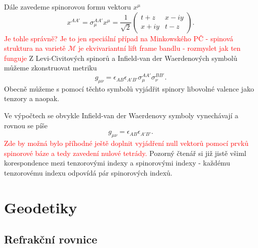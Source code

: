 Dále zavedeme spinorovou formu vektoru $x^\mu$
\begin{equation}
    x^{AA'} = \sigma_\mu^{AA'} x^\mu = \frac{1}{\sqrt{2}} \begin{pmatrix}
        t + z & x - iy \\
        x + iy & t - z
    \end{pmatrix}.
\end{equation}
\textcolor{red}{Je tohle správně? Je to jen speciální případ na Minkowského PČ - spinová
struktura na varietě $\mathcal{M}$ je ekvivariantní lift frame bandlu - rozmyslet jak ten
funguje}
Z Levi-Civitových spinorů a Infield-van der Waerdenových symbolů můžeme zkonstruovat metriku
\begin{equation}
    g_{\mu \nu} = \epsilon_{AB} \epsilon_{A'B'} \sigma_\mu^{AA'} \sigma_\nu^{BB'}.
\end{equation}
Obecně můžeme s pomocí těchto symbolů vyjádřit spinory libovolné valence jako tenzory a
naopak.

Ve výpočtech se obvykle Infield-van der Waerdenovy symboly vynechávají a rovnou se píše
\begin{equation}
    g_{\mu \nu} = \epsilon_{AB}\epsilon_{A'B'}.
\end{equation}
\textcolor{red}{Zde by možná bylo příhodné ještě doplnit vyjádření null vektorů pomocí prvků spinorové báze
a tedy zavedení nulové tetrády.}
Pozorný čtenář si již jistě všiml korespondence mezi tenzorovými indexy a spinorovými indexy - každému
tenzorovému indexu odpovídá pár spinorových indexů.



\section{Geodetiky}


\subsection{Refrakční rovnice}